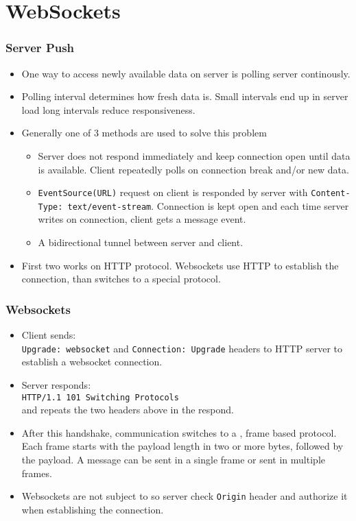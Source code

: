 \documentclass[trans,compress,xcolor=table]{beamer}
\begin{document}
\section{WebSockets}
\begin{frame}[fragile]
\frametitle{Server Push}
\begin{itemize}
\item One way to access newly available data on server is polling server continously.
\item Polling interval determines how fresh data is. Small intervals end up in server load
	long intervals reduce responsiveness.
\item Generally one of 3 methods are used to solve this problem
\begin{itemize}
	\item {} Server does not respond immediately and keep connection open until
		data is available. Client repeatedly polls on connection break and/or new data.
	\item {} \lstinline!EventSource(URL)! request on client is responded
		by server with \texttt{\small Content-Type: text/event-stream}. Connection is kept open and each time server
	writes on connection, client gets a message event.
	\item {} A bidirectional tunnel between server and client.
\end{itemize}
\item First two works on HTTP protocol. Websockets use HTTP to establish the connection, than switches to a special protocol.
\end{itemize}
\end{frame}

\begin{frame}[fragile]
\frametitle{Websockets}
\begin{itemize}
\item Client sends:\\
	 \texttt{Upgrade: websocket} and \texttt{Connection: Upgrade} headers
	to HTTP server to establish a websocket connection.
\item Server responds:\\
	 \texttt{HTTP/1.1 101 Switching Protocols}\\
	and repeats the two headers above in the respond.
\item After this handshake, communication switches to a , 
	 frame based protocol. Each frame
starts with the payload length in two or more bytes, followed by the payload. A message can be sent in a single frame or sent in multiple frames.
\item Websockets are not subject to  so server check \texttt{Origin} header and authorize it  when establishing the connection.
\end{itemize}
\end{frame}
\end{document}
